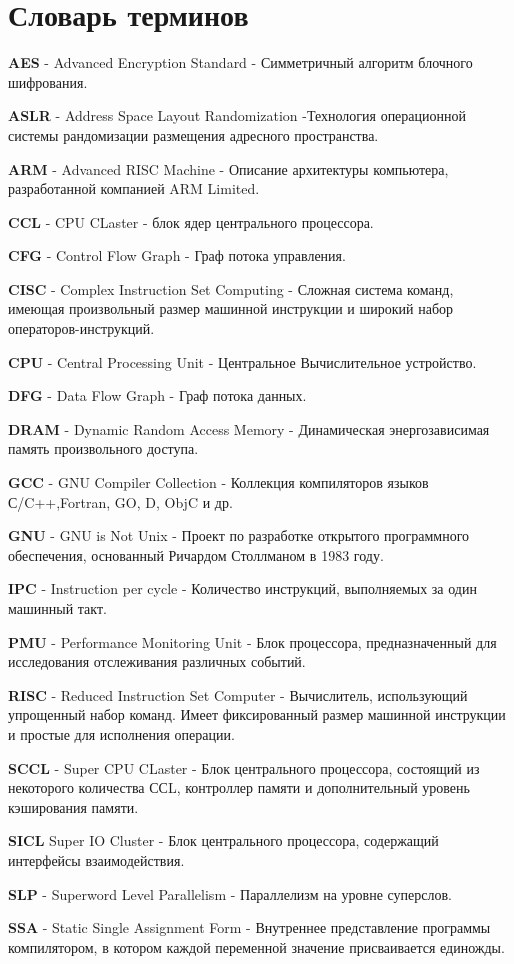 \chapter*{Словарь терминов}             %

\textbf{AES} - Advanced Encryption Standard  - Симметричный алгоритм блочного шифрования.

\textbf{ASLR} - Address Space Layout Randomization -Технология операционной системы рандомизации размещения адресного пространства.

\textbf{ARM} - Advanced RISC Machine - Описание архитектуры компьютера, разработанной компанией  ARM Limited.

\textbf{CCL} - CPU CLaster - блок ядер центрального процессора.

\textbf{CFG} - Control Flow Graph - Граф потока управления.

\textbf{CISC} - Complex Instruction Set Computing  - Сложная система команд, имеющая произвольный размер машинной инструкции и широкий набор операторов-инструкций.

\textbf{CPU} - Central Processing Unit - Центральное Вычислительное устройство.

\textbf{DFG} - Data Flow Graph  - Граф потока данных.

\textbf{DRAM} - Dynamic Random Access Memory - Динамическая энергозависимая память произвольного доступа.

\textbf{GCC} - GNU Compiler Collection - Коллекция компиляторов языков С/C++,Fortran, GO, D, ObjC и др.

\textbf{GNU} - GNU is Not Unix - Проект по разработке открытого программного обеспечения, основанный Ричардом Столлманом в 1983 году.

\textbf{IPC} - Instruction per cycle - Количество инструкций, выполняемых за один машинный такт. 

\textbf{PMU} - Performance Monitoring Unit - Блок процессора, предназначенный для исследования отслеживания различных событий.

\textbf{RISC} - Reduced Instruction Set Computer -  Вычислитель, использующий упрощенный набор команд. Имеет фиксированный размер машинной инструкции и простые для исполнения операции. 

\textbf{SCCL} - Super CPU CLaster - Блок центрального процессора, состоящий из некоторого количества ССL, контроллер памяти и  дополнительный уровень кэширования памяти.

\textbf{SICL} Super IO Cluster - Блок центрального процессора, содержащий интерфейсы взаимодействия.

\textbf{SLP} - Superword Level Parallelism - Параллелизм на уровне суперслов.

\textbf{SSA} - Static Single Assignment Form - Внутреннее представление программы компилятором, в котором каждой переменной значение присваивается единожды.





